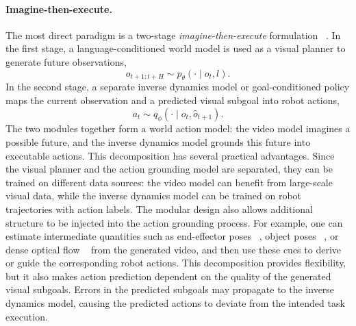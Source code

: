\paragraph{Imagine-then-execute.}
The most direct paradigm is a two-stage \emph{imagine-then-execute} formulation ~\cite{unipi,susie,wen2024atm,liang2024dreamitate,avdc,feng2025vidar,gvftape,RIGVid}. In the first stage, a language-conditioned world model is used as a visual planner to generate future observations,
\[
o_{t+1:t+H} \sim p_\theta(\cdot \mid o_t, l).
\]
In the second stage, a separate inverse dynamics model or goal-conditioned policy maps the current observation and a predicted visual subgoal into robot actions,
\[
a_t \sim q_\phi(\cdot \mid o_t, \hat{o}_{t+1}).
\]
The two modules together form a world action model: the video model imagines a possible future, and the inverse dynamics model grounds this future into executable actions. This decomposition has several practical advantages. Since the visual planner and the action grounding model are separated, they can be trained on different data sources: the video model can benefit from large-scale visual data, while the inverse dynamics model can be trained on robot trajectories with action labels. The modular design also allows additional structure to be injected into the action grounding process. For example, one can estimate intermediate quantities such as end-effector poses ~\cite{gvftape, liang2024dreamitate}, object poses ~\cite{RIGVid}, or dense optical flow ~\cite{avdc} from the generated video, and then use these cues to derive or guide the corresponding robot actions. This decomposition provides flexibility, but it also makes action prediction dependent on the quality of the generated visual subgoals. Errors in the predicted subgoals may propagate to the inverse dynamics model, causing the predicted actions to deviate from the intended task execution.


